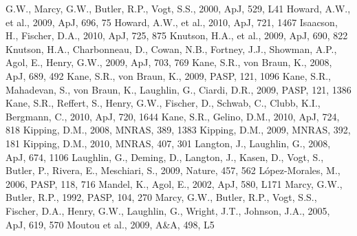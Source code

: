 \documentclass[12pt,preprint]{emulateapj}
\begin{document}
\begin{thebibliography}{}
  G.W., Marcy, G.W., Butler, R.P., Vogt, S.S., 2000, ApJ, 529, L41
  Howard, A.W., et al., 2009, ApJ, 696, 75
  Howard, A.W., et al., 2010, ApJ, 721, 1467
  Isaacson, H., Fischer, D.A., 2010, ApJ, 725, 875
  Knutson, H.A., et al., 2009, ApJ, 690, 822
  Knutson, H.A., Charbonneau, D., Cowan, N.B., Fortney, J.J., Showman,
  A.P., Agol, E., Henry, G.W., 2009, ApJ, 703, 769
  Kane, S.R., von Braun, K., 2008, ApJ, 689, 492
  Kane, S.R., von Braun, K., 2009, PASP, 121, 1096
 Kane,
  S.R., Mahadevan, S., von Braun, K., Laughlin, G., Ciardi, D.R.,
  2009, PASP, 121, 1386
 Kane,
  S.R., Reffert, S., Henry, G.W., Fischer, D., Schwab, C., Clubb,
  K.I., Bergmann, C., 2010, ApJ, 720, 1644
 Kane,
  S.R., Gelino, D.M., 2010, ApJ, 724, 818
 Kipping, D.M.,
  2008, MNRAS, 389, 1383
 Kipping, D.M.,
  2009, MNRAS, 392, 181
 Kipping, D.M.,
  2010, MNRAS, 407, 301
  Langton, J., Laughlin, G., 2008, ApJ, 674, 1106
  Laughlin, G., Deming, D., Langton, J., Kasen, D., Vogt, S., Butler,
  P., Rivera, E., Meschiari, S., 2009, Nature, 457, 562
  L\'opez-Morales, M., 2006, PASP, 118, 716
  Mandel, K., Agol, E., 2002, ApJ, 580, L171
  Marcy, G.W., Butler, R.P., 1992, PASP, 104, 270
 Marcy,
  G.W., Butler, R.P., Vogt, S.S., Fischer, D.A., Henry, G.W.,
  Laughlin, G., Wright, J.T., Johnson, J.A., 2005, ApJ, 619, 570
 Moutou
  et al., 2009, A\&A, 498, L5

\end{thebibliography}
\end{document}

